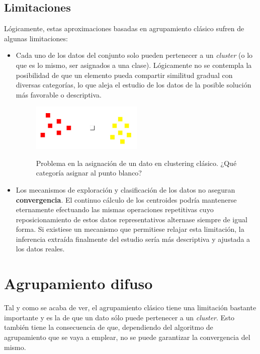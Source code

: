 \documentclass[]{report}
\begin{document}
		\section{Limitaciones}
		
			Lógicamente, estas aproximaciones basadas en agrupamiento clásico sufren de algunas limitaciones:
			
			\begin{itemize}
				\item Cada uno de los datos del conjunto solo pueden pertenecer a un \textit{cluster} (o lo que es lo mismo, ser asignados a una clase). Lógicamente no se contempla la posibilidad de que un elemento pueda compartir similitud gradual con diversas categorías, lo que aleja el estudio de los datos de la posible solución más favorable o descriptiva.
				
				\begin{figure}[h]
					\centering
					\includegraphics[width=0.5\textwidth]{Artboard1.jpg}
					\label{clustering2}
					\caption{Problema en la asignación de un dato en clustering clásico. ¿Qué categoría asignar al punto blanco?}
				\end{figure}
			
				\item Los mecanismos de exploración y clasificación de los datos no aseguran \textbf{convergencia}. El continuo cálculo de los centroides podría mantenerse eternamente efectuando las mismas operaciones repetitivas cuyo reposicionamiento de estos datos representativos alternase siempre de igual forma. Si existiese un mecanismo que permitiese relajar esta limitación, la inferencia extraída finalmente del estudio sería más descriptiva y ajustada a los datos reales.
			\end{itemize}
	
	\chapter{Agrupamiento difuso}
		Tal y como se acaba de ver, el agrupamiento clásico tiene una limitación bastante importante y es la de que un dato sólo puede pertenecer a un \textit{cluster}. Esto también tiene la consecuencia de que, dependiendo del algoritmo de agrupamiento que se vaya a emplear, no se puede garantizar la convergencia del mismo.\\
		
\end{document}
